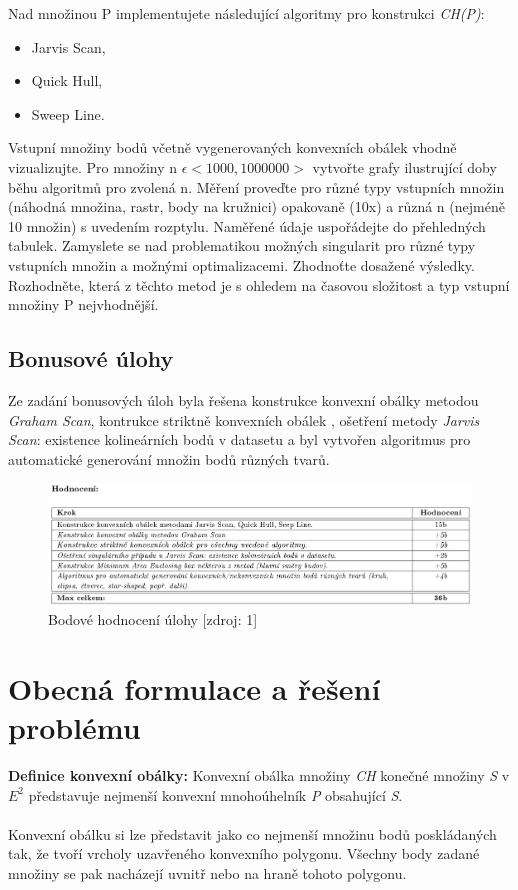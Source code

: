 \documentclass[a4paper, 12pt]{article}
\begin{document}
Nad množinou P implementujete následující algoritmy pro konstrukci \textit{CH(P)}:
\begin{itemize}
  \item Jarvis Scan,
  \item Quick Hull,
  \item Sweep Line.
\end{itemize}

Vstupní množiny bodů včetně vygenerovaných konvexních obálek vhodně vizualizujte. Pro množiny n $\epsilon< 1000, 1000000 >$
vytvořte grafy ilustrující doby běhu algoritmů pro zvolená n. Měření proveďte pro různé typy vstupních množin
(náhodná množina, rastr, body na kružnici) opakovaně (10x) a různá n (nejméně 10 množin) s uvedením rozptylu.
Naměřené údaje uspořádejte do přehledných tabulek.
Zamyslete se nad problematikou možných singularit pro různé typy vstupních množin a možnými optimalizacemi.
Zhodnoťte dosažené výsledky. Rozhodněte, která z těchto metod je s ohledem na časovou složitost a typ vstupní
množiny P nejvhodnější.

\subsection{Bonusové úlohy}

Ze zadání bonusových úloh byla řešena konstrukce konvexní obálky metodou \textit{Graham Scan}, kontrukce striktně konvexních obálek , ošetření metody \textit{Jarvis Scan}: existence kolineárních bodů v datasetu a byl vytvořen algoritmus pro automatické generování množin bodů různých tvarů. 

\begin{figure}[h!]
	\centering
	\includegraphics[width=16cm]{hodnoceni.jpg}
	\caption{Bodové hodnocení úlohy [zdroj: 1]}
\end{figure}

\clearpage

\section{Obecná formulace a řešení problému}
\textbf{Definice konvexní obálky:} Konvexní obálka množiny \textit{CH} konečné množiny \textit{S} v $E^2$ představuje nejmenší konvexní mnohoúhelník \textit{P} obsahující \textit{S}.\\
\\
Konvexní obálku si lze představit jako co nejmenší množinu bodů poskládaných tak, že tvoří vrcholy uzavřeného konvexního polygonu. Všechny body zadané množiny se pak nacházejí uvnitř nebo na hraně tohoto polygonu.\\
\end{document}
